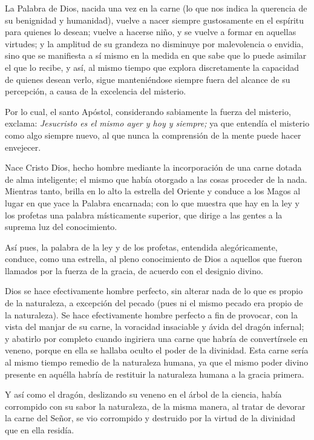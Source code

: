 			\begin{body}
				La Palabra de Dios, nacida una vez en la carne (lo que nos indica la querencia de su benignidad y humanidad), vuelve a nacer siempre gustosamente en el espíritu para quienes lo desean; vuelve a hacerse niño, y se vuelve a formar en aquellas virtudes; y la amplitud de su grandeza no disminuye por malevolencia o envidia, sino que se manifiesta a sí mismo en la medida en que sabe que lo puede asimilar el que lo recibe, y así, al mismo tiempo que explora discretamente la capacidad de quienes desean verlo, sigue manteniéndose siempre fuera del alcance de su percepción, a causa de la excelencia del misterio.
				
				Por lo cual, el santo Apóstol, considerando sabiamente la fuerza del misterio, exclama: \emph{Jesucristo es el mismo ayer y hoy y siempre;} ya que entendía el misterio como algo siempre nuevo, al que nunca la comprensión de la mente puede hacer envejecer.
				
				Nace Cristo Dios, hecho hombre mediante la incorporación de una carne dotada de alma inteligente; el mismo que había otorgado a las cosas proceder de la nada. Mientras tanto, brilla en lo alto la estrella del Oriente y conduce a los Magos al lugar en que yace la Palabra encarnada; con lo que muestra que hay en la ley y los profetas una palabra místicamente superior, que dirige a las gentes a la suprema luz del conocimiento.
				
				Así pues, la palabra de la ley y de los profetas, entendida alegóricamente, conduce, como una estrella, al pleno conocimiento de Dios a aquellos que fueron llamados por la fuerza de la gracia, de acuerdo con el designio divino.
				
				Dios se hace efectivamente hombre perfecto, sin alterar nada de lo que es propio de la naturaleza, a excepción del pecado (pues ni el mismo pecado era propio de la naturaleza). Se hace efectivamente hombre perfecto a fin de provocar, con la vista del manjar de su carne, la voracidad insaciable y ávida del dragón infernal; y abatirlo por completo cuando ingiriera una carne que habría de convertírsele en veneno, porque en ella se hallaba oculto el poder de la divinidad. Esta carne sería al mismo tiempo remedio de la naturaleza humana, ya que el mismo poder divino presente en aquélla habría de restituir la naturaleza humana a la gracia primera.
				
				Y así como el dragón, deslizando su veneno en el árbol de la ciencia, había corrompido con su sabor la naturaleza, de la misma manera, al tratar de devorar la carne del Señor, se vio corrompido y destruido por la virtud de la divinidad que en ella residía.
				

\end{body}
